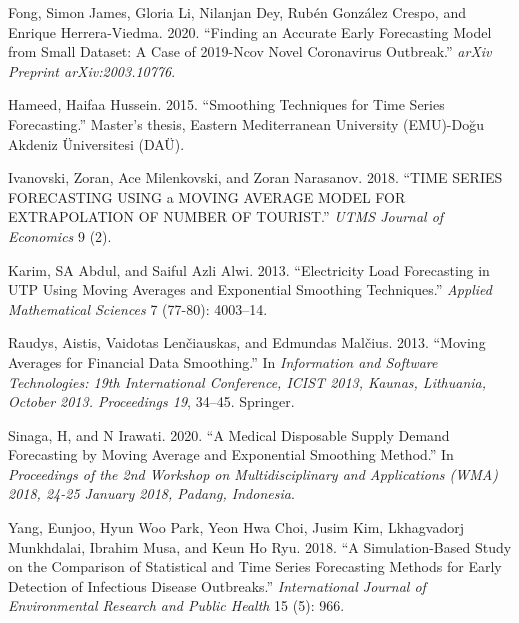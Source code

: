 \documentclass{article}
\newlength{\cslhangindent}
\newlength{\cslentryspacingunit} %
\newenvironment{CSLReferences}[2] %
 {%
  \setlength{\parindent}{0pt}
  \ifodd #1
  \let\oldpar\par
  \def\par{\hangindent=\cslhangindent\oldpar}
  \fi
  \setlength{\parskip}{#2\cslentryspacingunit}
 }%
 {}
\begin{document}
\hypertarget{refs}{}
\begin{CSLReferences}{1}{0}
\leavevmode{}%
Fong, Simon James, Gloria Li, Nilanjan Dey, Rubén González Crespo, and
Enrique Herrera-Viedma. 2020. {``Finding an Accurate Early Forecasting
Model from Small Dataset: A Case of 2019-Ncov Novel Coronavirus
Outbreak.''} \emph{arXiv Preprint arXiv:2003.10776}.

\leavevmode{}%
Hameed, Haifaa Hussein. 2015. {``Smoothing Techniques for Time Series
Forecasting.''} Master's thesis, Eastern Mediterranean University
(EMU)-Do{ğ}u Akdeniz {Ü}niversitesi (DA{Ü}).

\leavevmode{}%
Ivanovski, Zoran, Ace Milenkovski, and Zoran Narasanov. 2018. {``TIME
SERIES FORECASTING USING a MOVING AVERAGE MODEL FOR EXTRAPOLATION OF
NUMBER OF TOURIST.''} \emph{UTMS Journal of Economics} 9 (2).

\leavevmode{}%
Karim, SA Abdul, and Saiful Azli Alwi. 2013. {``Electricity Load
Forecasting in UTP Using Moving Averages and Exponential Smoothing
Techniques.''} \emph{Applied Mathematical Sciences} 7 (77-80): 4003--14.

\leavevmode{}%
Raudys, Aistis, Vaidotas Lenčiauskas, and Edmundas Malčius. 2013.
{``Moving Averages for Financial Data Smoothing.''} In \emph{Information
and Software Technologies: 19th International Conference, ICIST 2013,
Kaunas, Lithuania, October 2013. Proceedings 19}, 34--45. Springer.

\leavevmode{}%
Sinaga, H, and N Irawati. 2020. {``A Medical Disposable Supply Demand
Forecasting by Moving Average and Exponential Smoothing Method.''} In
\emph{Proceedings of the 2nd Workshop on Multidisciplinary and
Applications (WMA) 2018, 24-25 January 2018, Padang, Indonesia}.

\leavevmode{}%
Yang, Eunjoo, Hyun Woo Park, Yeon Hwa Choi, Jusim Kim, Lkhagvadorj
Munkhdalai, Ibrahim Musa, and Keun Ho Ryu. 2018. {``A Simulation-Based
Study on the Comparison of Statistical and Time Series Forecasting
Methods for Early Detection of Infectious Disease Outbreaks.''}
\emph{International Journal of Environmental Research and Public Health}
15 (5): 966.

\end{CSLReferences}



\end{document}
